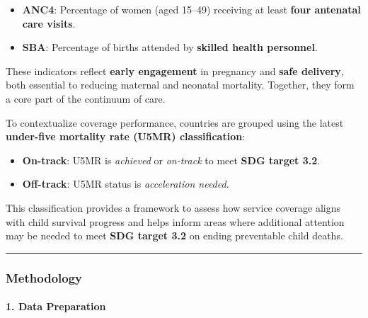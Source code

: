 \documentclass[
]{article}
\providecommand{\tightlist}{%
  \setlength{\itemsep}{0pt}\setlength{\parskip}{0pt}}
\begin{document}
\begin{itemize}
\tightlist
\item
  \textbf{ANC4}: Percentage of women (aged 15--49) receiving at least
  \textbf{four antenatal care visits}.
\item
  \textbf{SBA}: Percentage of births attended by \textbf{skilled health
  personnel}.
\end{itemize}

These indicators reflect \textbf{early engagement} in pregnancy and
\textbf{safe delivery}, both essential to reducing maternal and neonatal
mortality. Together, they form a core part of the continuum of care.

To contextualize coverage performance, countries are grouped using the
latest \textbf{under-five mortality rate (U5MR) classification}:

\begin{itemize}
\tightlist
\item
  \textbf{On-track}: U5MR is \emph{achieved} or \emph{on-track} to meet
  \textbf{SDG target 3.2}.
\item
  \textbf{Off-track}: U5MR status is \emph{acceleration needed}.
\end{itemize}

This classification provides a framework to assess how service coverage
aligns with child survival progress and helps inform areas where
additional attention may be needed to meet \textbf{SDG target 3.2} on
ending preventable child deaths.

\begin{center}\rule{0.5\linewidth}{0.5pt}\end{center}

\subsubsection{Methodology}\label{methodology}

\paragraph{1. Data Preparation}\label{data-preparation}
\end{document}
